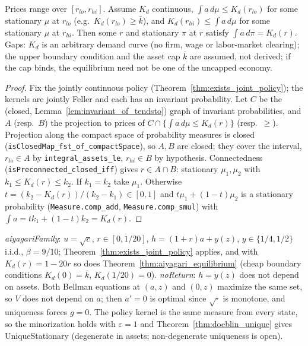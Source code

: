 \begin{theorem}
\label{thm:aiyagari_equilibrium}
\leanok
{}
Prices range over $[r_{lo}, r_{hi}]$. Assume $K_d$ continuous, $\int a\,d\mu \le K_d(r_{lo})$ for some stationary $\mu$
at $r_{lo}$ (e.g.\ $K_d(r_{lo})\ge\bar k$), and $K_d(r_{hi}) \le \int a\,d\mu$
for some stationary $\mu$ at $r_{hi}$. Then some $r$ and stationary $\pi$ at $r$ satisfy $\int a\,d\pi = K_d(r)$.
Gaps: $K_d$ is an arbitrary demand curve (no firm, wage or labor-market clearing); the upper boundary condition
and the asset cap $\bar k$ are assumed, not derived; if the cap binds, the equilibrium need not be one of the
uncapped economy.
\end{theorem}
\begin{proof}
\leanok
{}
Fix the jointly continuous policy (Theorem~\ref{thm:exists_joint_policy}); the kernels are jointly Feller and each
has an invariant probability. Let $C$ be the (closed, Lemma~\ref{lem:invariant_of_tendsto}) graph of invariant
probabilities, and $A$ (resp.\ $B$) the projection to prices of $C \cap \{\int a\,d\mu \le K_d(r)\}$ (resp.\ $\ge$).
Projection along the compact space of probability measures is closed (\texttt{isClosedMap\_fst\_of\_compactSpace}),
so $A,B$ are closed; they cover the interval, $r_{lo}\in A$ by \texttt{integral\_assets\_le}, $r_{hi}\in B$ by
hypothesis. Connectedness (\texttt{isPreconnected\_closed\_iff}) gives $r\in A\cap B$: stationary $\mu_1,\mu_2$ with
$k_1 \le K_d(r) \le k_2$. If $k_1 = k_2$ take $\mu_1$. Otherwise $t = (k_2 - K_d(r))/(k_2-k_1)\in[0,1]$ and
$t\mu_1 + (1-t)\mu_2$ is a stationary probability (\texttt{Measure.comp\_add}, \texttt{Measure.comp\_smul}) with
$\int a = tk_1 + (1-t)k_2 = K_d(r)$.
\end{proof}

\begin{remark}
\label{rem:aiyagari_examples}
\leanok
{}
\emph{aiyagariFamily}: $u=\sqrt c$, $r\in[0,1/20]$, $h = (1+r)a + y(z)$, $y\in\{1/4,1/2\}$ i.i.d., $\beta = 9/10$;
Theorem~\ref{thm:exists_joint_policy} applies, and with $K_d(r) = 1 - 20r$ so does
Theorem~\ref{thm:aiyagari_equilibrium} (cheap boundary conditions $K_d(0)=\bar k$, $K_d(1/20) = 0$). \emph{noReturn}: $h = y(z)$ does not depend on assets. Both Bellman
equations at $(a,z)$ and $(0,z)$ maximize the same set, so $V$ does not depend on $a$; then $a'=0$ is optimal since
$\sqrt{\cdot}$ is monotone, and uniqueness forces $g = 0$. The policy kernel is the same measure from every state,
so the minorization holds with $\varepsilon=1$ and Theorem~\ref{thm:doeblin_unique} gives UniqueStationary
(degenerate in assets; non-degenerate uniqueness is open).
\end{remark}

